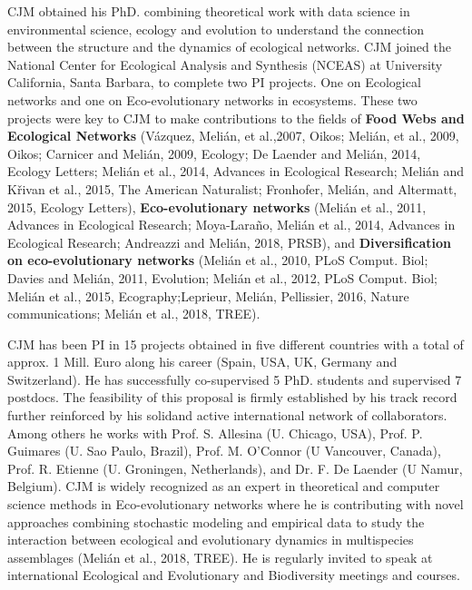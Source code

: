 \documentclass[authoryear,1p,12pt]{elsarticle}
\begin{document}
     CJM obtained his PhD. combining theoretical work with data
     science in environmental science, ecology and evolution to
     understand the connection between the structure and the dynamics
     of ecological networks. CJM joined the National Center for
     Ecological Analysis and Synthesis (NCEAS) at University
     California, Santa Barbara, to complete two PI projects. One on
     Ecological networks and one on Eco-evolutionary networks in
     ecosystems. These two projects were key to CJM to make
     contributions to the fields of {\bf Food Webs and Ecological
       Networks} (Vázquez, Melián, et al.,2007, Oikos; Melián, et al.,
     2009, Oikos; Carnicer and Melián, 2009, Ecology; De Laender and
     Melián, 2014, Ecology Letters; Melián et al., 2014, Advances in
     Ecological Research; Melián and Křivan et al., 2015, The American
     Naturalist; Fronhofer, Melián, and Altermatt, 2015, Ecology
     Letters), {\bf Eco-evolutionary networks} (Melián et al., 2011,
     Advances in Ecological Research; Moya-Laraño, Melián et al.,
     2014, Advances in Ecological Research; Andreazzi and Melián,
     2018, PRSB), and {\bf Diversification on eco-evolutionary
       networks} (Melián et al., 2010, PLoS Comput. Biol; Davies and
     Melián, 2011, Evolution; Melián et al., 2012, PLoS Comput. Biol;
     Melián et al., 2015, Ecography;Leprieur, Melián, Pellissier,
     2016, Nature communications; Melián et al., 2018, TREE).

     CJM has been PI in 15 projects obtained in five different
     countries with a total of approx. 1 Mill. Euro along his career
     (Spain, USA, UK, Germany and Switzerland). He has successfully
     co-supervised 5 PhD. students and supervised 7 postdocs. The
     feasibility of this proposal is firmly established by his track
     record further reinforced by his solidand active international
     network of collaborators. Among others he works with
     Prof. S. Allesina (U. Chicago, USA), Prof. P. Guimares (U. Sao
     Paulo, Brazil), Prof.  M.  O’Connor (U Vancouver, Canada),
     Prof. R. Etienne (U. Groningen, Netherlands), and Dr. F. De
     Laender (U Namur, Belgium). CJM is widely recognized as an expert
     in theoretical and computer science methods in Eco-evolutionary
     networks where he is contributing with novel approaches combining
     stochastic modeling and empirical data to study the interaction
     between ecological and evolutionary dynamics in multispecies
     assemblages (Melián et al., 2018, TREE). He is regularly invited
     to speak at international Ecological and Evolutionary and
     Biodiversity meetings and courses.
     
\end{document}
